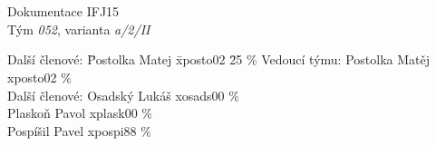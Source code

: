 \documentclass[a4paper, 12pt]{article}
\begin{document}
\begin{titlepage}

\begin{center}
\fontsize{25}{20}\\
\fontsize{21}{0}\textsc{\selectfont{Fakulta informačních technologií}}\\
\begin{figure}[ht]
    \begin{center}
    \end{center}
\end{figure}

\LARGE{Dokumentace IFJ15}\\
\Large{Tým \textit{052}, varianta \textit{a/2/II}}
\end{center}

\begin{large}
\begin{tabbing}
    Další členové: \quad \= Postolka Matej \quad \= xposto02 \quad \= 25 \%\kill
    Vedoucí týmu:  \> Postolka Matěj \> xposto02  \% \\
    Další členové: \> Osadský Lukáš  \> xosads00  \% \\
             \> Plaskoň Pavol  \> xplask00  \% \\
             \> Pospíšil Pavel \> xpospi88  \% \\
\end{tabbing}
\end{large}

\end{titlepage}
\end{document}
